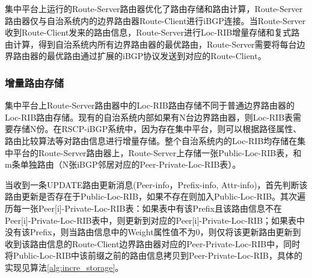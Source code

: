 集中平台上运行的Route-Server路由器优化了路由存储和路由计算，Route-Server路由器仅与自治系统内的边界路由器Route-Client进行iBGP连接。当Route-Server收到Route-Client发来的路由信息，Route-Server进行Loc-RIB增量存储和复式路由计算，得到自治系统内所有边界路由器的最优路由，Route-Server需要将每台边界路由器的最优路由通过扩展的iBGP协议发送到对应的Route-Client。


\subsubsection{增量路由存储}

集中平台上Route-Server路由器中的Loc-RIB路由存储不同于普通边界路由器的Loc-RIB路由存储。现有的自治系统内部如果有N台边界路由器，则Loc-RIB表需要存储N份。在RSCP-iBGP系统中，因为存在集中平台，则可以根据路径属性、路由比较算法等对路由信息进行增量存储。整个自治系统内的Loc-RIB均存储在集中平台的Route-Server路由器上，Route-Server上存储一张Public-Loc-RIB表，和m条单独路由（N张iBGP邻居对应的Peer-Private-Loc-RIB表）。

当收到一条UPDATE路由更新消息(Peer-info，Prefix-info, Attr-info)，首先判断该路由更新是否存在于Public-Loc-RIB，如果不存在则加入Public-Loc-RIB。其次遍历每一张Peer[i]-Private-Loc-RIB表：如果表中有该Prefix且该路由信息不在Peer[i]-Private-Loc-RIB表中，则更新到对应的Peer[i]-Private-Loc-RIB；如果表中没有该Prefix，则当路由信息中的Weight属性值不为0，则仅将该更新路由更新到收到该路由信息的Route-Client边界路由器对应的Peer-Private-Loc-RIB中，同时将Public-Loc-RIB中该前缀之前的路由信息拷贝到Peer-Private-Loc-RIB，具体的实现见算法\ref{alg:incre_storage}。

